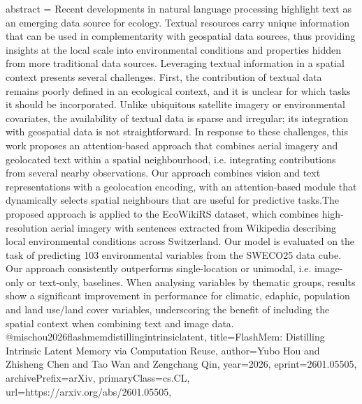 {      abstract = {Recent developments in natural language processing highlight text as an emerging data source for ecology. Textual resources carry unique information that can be used in complementarity with geospatial data sources, thus providing insights at the local scale into environmental conditions and properties hidden from more traditional data sources. Leveraging textual information in a spatial context presents several challenges. First, the contribution of textual data remains poorly defined in an ecological context, and it is unclear for which tasks it should be incorporated. Unlike ubiquitous satellite imagery or environmental covariates, the availability of textual data is sparse and irregular; its integration with geospatial data is not straightforward. In response to these challenges, this work proposes an attention-based approach that combines aerial imagery and geolocated text within a spatial neighbourhood, i.e. integrating contributions from several nearby observations. Our approach combines vision and text representations with a geolocation encoding, with an attention-based module that dynamically selects spatial neighbours that are useful for predictive tasks.The proposed approach is applied to the EcoWikiRS dataset, which combines high-resolution aerial imagery with sentences extracted from Wikipedia describing local environmental conditions across Switzerland. Our model is evaluated on the task of predicting 103 environmental variables from the SWECO25 data cube. Our approach consistently outperforms single-location or unimodal, i.e. image-only or text-only, baselines. When analysing variables by thematic groups, results show a significant improvement in performance for climatic, edaphic, population and land use/land cover variables, underscoring the benefit of including the spatial context when combining text and image data.}
}@misc{hou2026flashmemdistillingintrinsiclatent,
      title={FlashMem: Distilling Intrinsic Latent Memory via Computation Reuse}, 
      author={Yubo Hou and Zhisheng Chen and Tao Wan and Zengchang Qin},
      year={2026},
      eprint={2601.05505},
      archivePrefix={arXiv},
      primaryClass={cs.CL},
      url={https://arxiv.org/abs/2601.05505},
}
